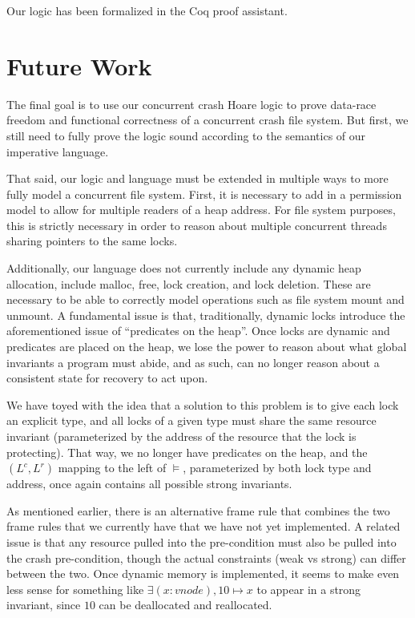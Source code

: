 Our logic has been formalized in the Coq proof assistant.


\section{Future Work}


The final goal is to use our concurrent crash Hoare logic to prove data-race
freedom and functional correctness of a concurrent crash file system. But first,
we still need to fully prove the logic sound according to the semantics of our
imperative language.

That said, our logic and language must be extended in multiple ways to more
fully model a concurrent file system. First, it is necessary to add in a
permission model to allow for multiple readers of a heap address.  For file
system purposes, this is strictly necessary in order to reason about multiple
concurrent threads sharing pointers to the same locks.

Additionally, our language does not currently include any dynamic heap
allocation, include malloc, free, lock creation, and lock deletion. These are
necessary to be able to correctly model operations such as file system mount and
unmount. A fundamental issue is that, traditionally, dynamic locks introduce the
aforementioned issue of ``predicates on the heap''. Once locks are dynamic and
predicates are placed on the heap, we lose the power to reason about what global
invariants a program must abide, and as such, can no longer reason about a
consistent state for recovery to act upon.

We have toyed with the idea that a solution to this problem is to give each lock
an explicit type, and all locks of a given type must share the same resource
invariant (parameterized by the address of the resource that the lock is
protecting). That way, we no longer have predicates on the heap, and the
$(L^c,L^r)$ mapping to the left of $\vDash$, parameterized by both lock type and
address, once again contains all possible strong invariants.

As mentioned earlier, there is an alternative frame rule that combines the two
frame rules that we currently have that we have not yet implemented. A related
issue is that any resource pulled into the pre-condition must also be pulled
into the crash pre-condition, though the actual constraints (weak vs strong)
can differ between the two. Once dynamic memory is implemented, it seems to make
even less sense for something like $\exists (x:vnode), 10\mapsto x$ to appear in
a strong invariant, since $10$ can be deallocated and reallocated.

